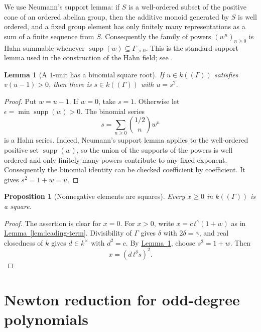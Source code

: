 \documentclass[11pt]{article}
\newcommand{\Val}{v}
\newcommand{\Supp}{\operatorname{supp}}
\newcommand{\namedref}[2]{\hyperref[#2]{#1~\ref*{#2}}}
\theoremstyle{proofnote}
\newtheorem{proposition}[theorem]{Proposition}
\newtheorem{lemma}[theorem]{Lemma}
\begin{document}
We use Neumann's support lemma: if \(S\) is a well-ordered subset of the
positive cone of an ordered abelian group, then the additive monoid generated
by \(S\) is well ordered, and a fixed group element has only finitely many
representations as a sum of a finite sequence from \(S\).  Consequently the
family of powers \((w^n)_{n\ge0}\) is Hahn summable whenever
\(\Supp(w)\subseteq\Gamma_{>0}\).  This is the standard support lemma used in
the construction of the Hahn field; see \cite{EnglerPrestel}.

\begin{lemma}[A \(1\)-unit has a binomial square root]
\label{lem:positive-unit-square}
  If \(u\in k((\Gamma))\) satisfies \(\Val(u-1)>0\), then there is
  \(s\in k((\Gamma))\) with \(u=s^2\).
\end{lemma}
\begin{proof}
  Put \(w=u-1\).  If \(w=0\), take \(s=1\).  Otherwise let
  \(\epsilon=\min\Supp(w)>0\).  The binomial series
  \[
    s=\sum_{n\ge0}\binom{1/2}{n}w^n
  \]
  is a Hahn series.  Indeed, Neumann's support lemma applies to the
  well-ordered positive set \(\Supp(w)\), so the union of the supports of the
  powers is well ordered and only finitely many powers contribute to any
  fixed exponent.  Consequently the
  binomial identity can be checked coefficient by coefficient.  It gives
  \(s^2=1+w=u\).
\end{proof}

\begin{proposition}[Nonnegative elements are squares]
\label{prop:hahn-squares}
  Every \(x\ge0\) in \(k((\Gamma))\) is a square.
\end{proposition}
\begin{proof}
  The assertion is clear for \(x=0\).  For \(x>0\), write
  \(x=c\,t^\gamma(1+w)\) as in \namedref{Lemma}{lem:leading-term}.
  Divisibility of \(\Gamma\) gives \(\delta\) with
  \(2\delta=\gamma\), and real closedness of \(k\) gives
  \(d\in k^\times\) with \(d^2=c\).  By
  \namedref{Lemma}{lem:positive-unit-square}, choose \(s^2=1+w\).  Then
  \[
    x=(d\,t^\delta s)^2.
  \]
\end{proof}

\section{Newton reduction for odd-degree polynomials}
\label{sec:newton-reduction}
\end{document}
